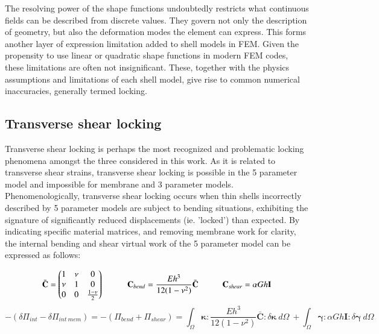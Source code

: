 The resolving power of the shape functions undoubtedly restricts what continuous fields can be described from discrete values. They govern not only the description of geometry, but also the deformation modes the element can express. This forms another layer of expression limitation added to shell models in FEM. Given the propensity to use linear or quadratic shape functions in modern FEM codes, these limitations are often not insignificant. These, together with the physics assumptions and limitations of each shell model, give rise to common numerical inaccuracies, generally termed locking.

\subsection{Transverse shear locking} \label{transverse_shear_locking}

Transverse shear locking is perhaps the most recognized and problematic locking phenomena amongst the three considered in this work. As it is related to transverse shear strains, transverse shear locking is possible in the 5 parameter model and impossible for membrane and 3 parameter models. Phenomenologically, transverse shear locking occurs when thin shells incorrectly described by 5 parameter models are subject to bending situations, exhibiting the signature of significantly reduced displacements (ie. 'locked') than expected. By indicating specific material matrices, and removing membrane work for clarity, the internal bending and shear virtual work of the 5 parameter model can be expressed as follows: 


\begin{equation} 
\bar{\mathbf{C}} =
\begin{pmatrix}
1 & \nu & 0 \\
\nu & 1 & 0 \\
0 & 0 & \frac{1-\nu}{2}
\end{pmatrix}
\hspace{10mm}
\mathbf{C}_{bend} = \frac{E h^3}{12(1-\nu^2)} \bar{ \mathbf{C}}
\hspace{10mm}
\mathbf{C}_{shear} = \alpha G h \mathbf{I}
\label{eqlock1}
\end{equation}
\begin{equation} 
-( \delta\Pi_{int} - \delta\Pi_{int\ mem} )=
-(\Pi_{bend} + \Pi_{shear}) =
\int_\Omega
\boldsymbol{\kappa}
:
\frac{E h^3}{12(1-\nu^2)} \bar{ \mathbf{C}}
:
\delta \boldsymbol{\kappa}\ 
d \Omega\ 
+
\int_\Omega
\boldsymbol{\gamma}
:
\alpha G h \mathbf{I}
:
\delta \boldsymbol{\gamma}\ 
d \Omega
\label{eqlock2}
\end{equation}



